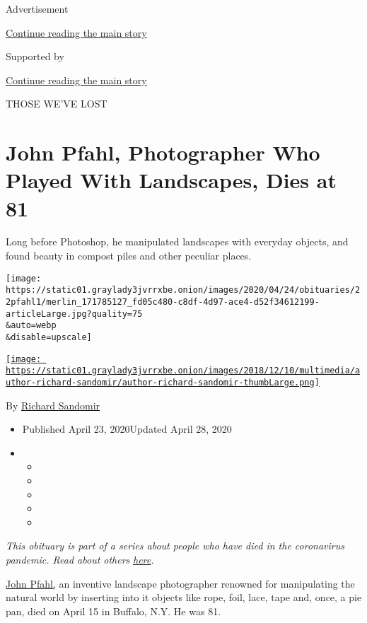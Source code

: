 Advertisement

\protect\hyperlink{after-top}{Continue reading the main story}

Supported by

\protect\hyperlink{after-sponsor}{Continue reading the main story}

THOSE WE'VE LOST

\hypertarget{john-pfahl-photographer-who-played-with-landscapes-dies-at-81}{%
\section{John Pfahl, Photographer Who Played With Landscapes, Dies at
81}\label{john-pfahl-photographer-who-played-with-landscapes-dies-at-81}}

Long before Photoshop, he manipulated landscapes with everyday objects,
and found beauty in compost piles and other peculiar places.

\texttt{[image: https://static01.graylady3jvrrxbe.onion/images/2020/04/24/obituaries/22pfahl1/merlin\_171785127\_fd05c480-c8df-4d97-ace4-d52f34612199-articleLarge.jpg?quality=75\\\&auto=webp\\\&disable=upscale]}

\href{https://www.nytimes3xbfgragh.onion/by/richard-sandomir}{\texttt{[image: https://static01.graylady3jvrrxbe.onion/images/2018/12/10/multimedia/author-richard-sandomir/author-richard-sandomir-thumbLarge.png]}}

By \href{https://www.nytimes3xbfgragh.onion/by/richard-sandomir}{Richard
Sandomir}

\begin{itemize}
\item
  Published April 23, 2020Updated April 28, 2020
\item
  \begin{itemize}
  \item
  \item
  \item
  \item
  \item
  \end{itemize}
\end{itemize}

\emph{This obituary is part of a series about people who have died in
the coronavirus pandemic. Read about others}
\href{https://www.nytimes3xbfgragh.onion/series/people-who-have-died-of-the-coronavirus}{\emph{here}}\emph{.}

\href{https://johnpfahl.com/}{John Pfahl,} an inventive landscape
photographer renowned for manipulating the natural world by inserting
into it objects like rope, foil, lace, tape and, once, a pie pan, died
on April 15 in Buffalo, N.Y. He was 81.

